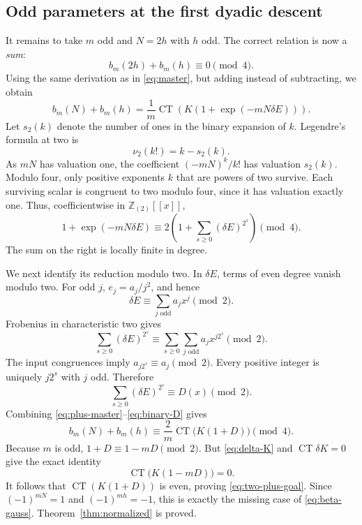 \documentclass[11pt,letterpaper]{article}
\numberwithin{equation}{section}
\theoremstyle{definition}
\newcommand{\Z}{\mathbb Z}
\newcommand{\Ztwo}{\Z_{(2)}}
\newcommand{\dd}{\delta}
\newcommand{\CT}{\operatorname{CT}}
\begin{document}
\subsection{Odd parameters at the first dyadic descent}

It remains to take $m$ odd and $N=2h$ with $h$ odd. The correct relation
is now a \emph{sum}:
\begin{equation}\label{eq:two-plus-goal}
b_m(2h)+b_m(h)\equiv0\pmod4.
\end{equation}
Using the same derivation as in \eqref{eq:master}, but adding instead of
subtracting, we obtain
\begin{equation}\label{eq:plus-master}
b_m(N)+b_m(h)
=\frac1m\CT\!\left(K\left(1+\exp(-mN\dd E)\right)\right).
\end{equation}
Let $s_2(k)$ denote the number of ones in the binary expansion of $k$.
Legendre's formula at two is
\[
\nu_2(k!)=k-s_2(k).
\]
As $mN$ has valuation one, the coefficient $( -mN)^k/k!$ has valuation
$s_2(k)$. Modulo four, only positive exponents $k$ that are powers of two
survive. Each surviving scalar is congruent to two modulo four, since it
has valuation exactly one. Thus, coefficientwise in $\Ztwo[[x]]$,
\begin{equation}\label{eq:binary-exponential}
1+\exp(-mN\dd E)
\equiv2\left(1+\sum_{s\geq0}(\dd E)^{2^s}\right)\pmod4.
\end{equation}
The sum on the right is locally finite in degree.

We next identify its reduction modulo two. In $\dd E$, terms of even
degree vanish modulo two. For odd $j$, $e_j=a_j/j^2$, and hence
\[
\dd E\equiv\sum_{j\text{ odd}}a_jx^j\pmod2.
\]
Frobenius in characteristic two gives
\[
\sum_{s\geq0}(\dd E)^{2^s}
\equiv\sum_{s\geq0}\sum_{j\text{ odd}}a_jx^{j2^s}\pmod2.
\]
The input congruences imply $a_{j2^s}\equiv a_j\pmod2$.
Every positive integer is uniquely $j2^s$ with $j$ odd. Therefore
\begin{equation}\label{eq:binary-D}
\sum_{s\geq0}(\dd E)^{2^s}\equiv D(x)\pmod2.
\end{equation}
Combining \eqref{eq:plus-master}--\eqref{eq:binary-D} gives
\[
b_m(N)+b_m(h)\equiv\frac2m\CT\bigl(K(1+D)\bigr)\pmod4.
\]
Because $m$ is odd,
$1+D\equiv1-mD\pmod2$. But \eqref{eq:delta-K} and $\CT\dd K=0$
give the exact identity
\begin{equation}\label{eq:ct-zero}
\CT\bigl(K(1-mD)\bigr)=0.
\end{equation}
It follows that $\CT(K(1+D))$ is even, proving
\eqref{eq:two-plus-goal}. Since $(-1)^{mN}=1$ and
$(-1)^{mh}=-1$, this is exactly the missing case of
\eqref{eq:beta-gauss}. Theorem~\ref{thm:normalized} is proved.
\end{document}
